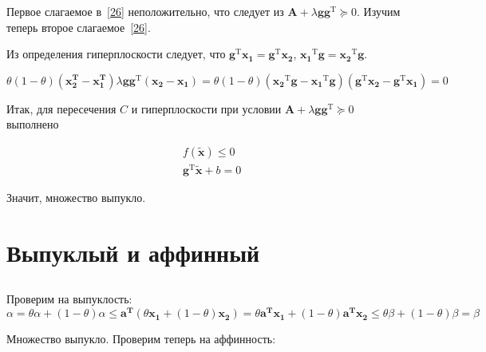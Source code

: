 	Первое слагаемое в~\eqref{26} неположительно, что следует из $\mathbf{A} + \lambda \mathbf{g}\mathbf{g}^\text{T} \succeq 0$. Изучим теперь второе слагаемое~\eqref{26}.
	
	Из определения гиперплоскости следует, что $\mathbf{g}^\text{T}\mathbf{x_1} = \mathbf{g}^\text{T}\mathbf{x_2}$, $\mathbf{x_1}^\text{T}\mathbf{g} = \mathbf{x_2}^\text{T}\mathbf{g}$.
	
	\begin{equation}
	\theta(1-\theta) (\mathbf{x_2^T} - \mathbf{x_1^T}) \lambda \mathbf{g}\mathbf{g}^\text{T} (\mathbf{x_2} -\mathbf{x_1}) = \theta(1-\theta)  ( \mathbf{x_2}^\text{T}\mathbf{g} - \mathbf{x_1}^\text{T}\mathbf{g}) (\mathbf{g}^\text{T} \mathbf{x_2} - \mathbf{g}^\text{T} \mathbf{x_1})=0
	\end{equation}
	
	Итак, для пересечения $C$ и гиперплоскости при условии $\mathbf{A} + \lambda \mathbf{g}\mathbf{g}^\text{T} \succeq 0$ выполнено 
	
	
	\begin{equation}
	\begin{split}
	&f(\mathbf{\tilde{x}}) \leqslant 0\\
	&\mathbf{g}^\text{T} \mathbf{\tilde{x}} + b =0
	\end{split}
	\end{equation}
	
	Значит, множество выпукло.
	
	\section{Выпуклый и аффинный}
	
	\subsection{}
	
	Проверим на выпуклость:
	\begin{equation}
	\alpha = \theta \alpha + (1 - \theta) \alpha \leqslant \mathbf{a^T} (\theta
	\mathbf{x_1} + (1 - \theta) \mathbf{x_2}) = \theta \mathbf{a^T} \mathbf{x_1} +
	(1 - \theta) \mathbf{a^T} \mathbf{x_2} \leqslant  \theta \beta + (1 - \theta)
	\beta = \beta 
	\end{equation}
	
	Множество выпукло. Проверим теперь на аффинность:
	
	\subsection{}
	
